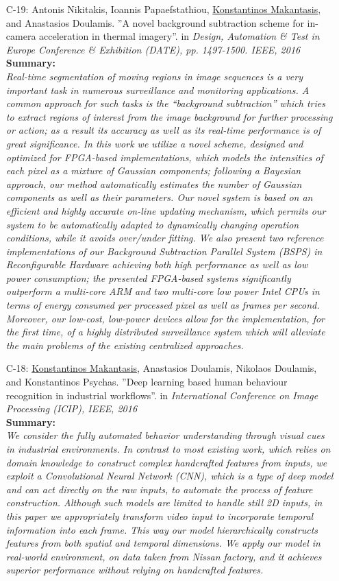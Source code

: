 \documentclass[a4paper,10pt]{article}
\begin{document}
\begin{itemize}
	\item [C-19:]Antonis Nikitakis, Ioannis Papaefstathiou, \underline{Konstantinos Makantasis}, and Anastasios Doulamis. ''A novel background subtraction scheme for in-camera acceleration in thermal imagery''. in \textit{Design, Automation \& Test in Europe Conference \& Exhibition (DATE), pp. 1497-1500. IEEE, 2016}\\
	\textbf{Summary:}\\
	\textit{Real-time segmentation of moving regions in image sequences is a very important task in numerous surveillance and monitoring applications. A common approach for such tasks is the “background subtraction” which tries to extract regions of interest from the image background for further processing or action; as a result its accuracy as well as its real-time performance is of great significance. In this work we utilize a novel scheme, designed and optimized for FPGA-based implementations, which models the intensities of each pixel as a mixture of Gaussian components; following a Bayesian approach, our method automatically estimates the number of Gaussian components as well as their parameters. Our novel system is based on an efficient and highly accurate on-line updating mechanism, which permits our system to be automatically adapted to dynamically changing operation conditions, while it avoids over/under fitting. We also present two reference implementations of our Background Subtraction Parallel System (BSPS) in Reconfigurable Hardware achieving both high performance as well as low power consumption; the presented FPGA-based systems significantly outperform a multi-core ARM and two multi-core low power Intel CPUs in terms of energy consumed per processed pixel as well as frames per second. Moreover, our low-cost, low-power devices allow for the implementation, for the first time, of a highly distributed surveillance system which will alleviate the main problems of the existing centralized approaches.}
	
	\item [C-18:]\underline{Konstantinos Makantasis}, Anastasios Doulamis, Nikolaos Doulamis, and Konstantinos Psychas. ''Deep learning based human behaviour recognition in industrial workflows''. in \textit{International Conference on Image Processing (ICIP), IEEE, 2016}\\
	\textbf{Summary:}\\
	\textit{We consider the fully automated behavior understanding through visual cues in industrial environments. In contrast to most existing work, which relies on domain knowledge to construct complex handcrafted features from inputs, we exploit a Convolutional Neural Network (CNN), which is a type of deep model and can act directly on the raw inputs, to automate the process of feature construction. Although such models are limited to handle still 2D inputs, in this paper we appropriately transform video input to incorporate temporal information into each frame. This way our model hierarchically constructs features from both spatial and temporal dimensions. We apply our model in real-world environment, on data taken from Nissan factory, and it achieves superior performance without relying on handcrafted features.}
	

\end{itemize}
\end{document}
